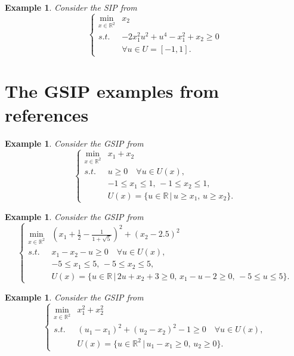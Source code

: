 \documentclass{amsart}
\theoremstyle{plain}
\newtheorem{exmp}[theorem]{Example}
\newcommand{\re}{\mathbb{R}}
\newcommand{\st}{\mathit{s.t.}}
\numberwithin{equation}{section}
\begin{document}
		\begin{exmp}\label{ex:wangguo}
		Consider the SIP from \cite{wang2014semidefinite}
		\[\left\{\begin{array}{cl}
		\min\limits_{x\in \re^2} & x_2\\
		\st & -2x_1^2u^2+u^4-x_1^2+x_2\ge 0\\
		& \forall u\in U = [-1,1].
		\end{array}
		\right.
		\]
		\end{exmp}

		
		
		\section{The GSIP examples from references}\label{sc:gsip_exp}
		\begin{exmp}\label{GlibP1} 
			Consider the GSIP from \cite{ruckmannStein2001}
			\[
			\left\{\begin{array}{cl}
				\min\limits_{x\in\re^2} & x_1+x_2\\
				\st & u\ge 0\quad \forall u\in U(x),\\
				& -1\le x_1\le 1,\, -1\le x_2\le 1,\\
				& U(x) = \{u\in\re\,\vert\, u\ge x_1,\,u\ge x_2\}.
			\end{array}
			\right.
			\]
		\end{exmp}
		
		\begin{exmp}\label{GlibP3}
			Consider the GSIP from \cite{Selassie04}
			\[
			\left\{\begin{array}{cl}
				\min\limits_{x\in\re^2} & \left( x_1+\frac{1}{2}-\frac{1}{1+\sqrt{5}} \right)^2 + (x_2-2.5)^2\\
				\st & x_1-x_2-u\ge 0\quad \forall u\in U(x),\\
				& -5\le x_1\le 5,\, -5\le x_2\le 5,\\
				& U(x) = \{u\in\re\,\vert\, 2u+x_2+3\ge 0,\, x_1-u-2\ge 0,\, -5\le u\le 5\}.
			\end{array}
			\right.
			\]
		\end{exmp}
		
		\begin{exmp}\label{GlibP5}
			Consider the GSIP from \cite{ruckmannStein2001}
			\[
			\left\{\begin{array}{ll}
				\min\limits_{x\in\re^2} & x_1^2+x_2^2\\
				\st & (u_1-x_1)^2+(u_2-x_2)^2-1\ge 0\quad \forall u\in U(x),\\
				& U(x) = \{u\in\re^2\,\vert\, u_1-x_1\ge 0,\, u_2\ge 0\}.
			\end{array}
			\right.
			\]
		\end{exmp}
		
\end{document}
